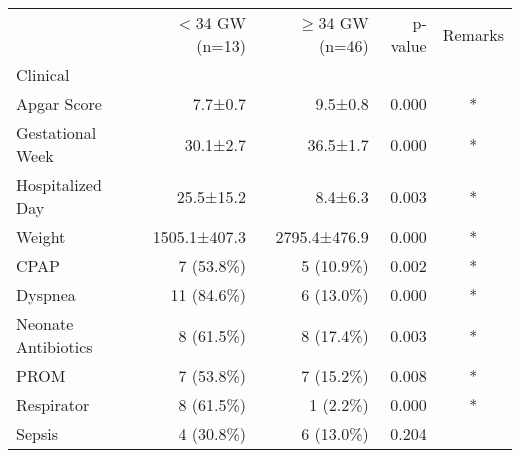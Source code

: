 \begin{tabular}{lrrrc}
\toprule
{} & $<$34 GW (n=13) & $\ge$34 GW (n=46) & p-value & Remarks \\
Clinical            &               &               &         &         \\
\midrule
Apgar Score         &       7.7±0.7 &       9.5±0.8 &   0.000 &       * \\
Gestational Week    &      30.1±2.7 &      36.5±1.7 &   0.000 &       * \\
Hospitalized Day    &     25.5±15.2 &       8.4±6.3 &   0.003 &       * \\
Weight              &  1505.1±407.3 &  2795.4±476.9 &   0.000 &       * \\
CPAP                &     7 (53.8\%) &     5 (10.9\%) &   0.002 &       * \\
Dyspnea             &    11 (84.6\%) &     6 (13.0\%) &   0.000 &       * \\
Neonate Antibiotics &     8 (61.5\%) &     8 (17.4\%) &   0.003 &       * \\
PROM                &     7 (53.8\%) &     7 (15.2\%) &   0.008 &       * \\
Respirator          &     8 (61.5\%) &      1 (2.2\%) &   0.000 &       * \\
Sepsis              &     4 (30.8\%) &     6 (13.0\%) &   0.204 &         \\
\bottomrule
\end{tabular}
